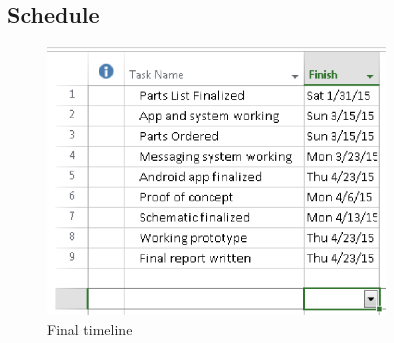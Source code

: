 \documentclass[12pt]{article}
\begin{document}
\subsection*{Schedule}
\begin{figure}[ht!]
\centering %
\includegraphics[width=0.8\textwidth]{schedule.eps} 
\caption{Final timeline} \label{schedule}
\end{figure}

\clearpage
\end{document}

